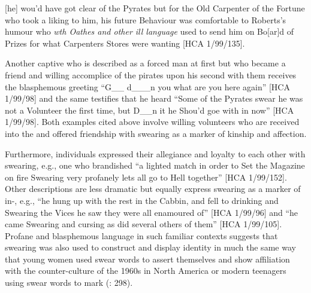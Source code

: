 [he] wou’d have got clear of the Pyrates but for the Old Carpenter of the Fortune who took a liking to him, his future Behaviour was comfortable to Roberts’s humour who \textit{wth Oathes and other ill language} used to send him on Bo[ar]d of Prizes for what Carpenters Stores were wanting [HCA 1/99/135]. 

Another captive who is described as a forced man at first but who became a friend and willing accomplice of the pirates upon his second  with them receives the blasphemous greeting “G\_\_ d\_\_\_n you what are you here again” [HCA 1/99/98] and the same  testifies that he heard “Some of the Pyrates swear he was not a Volunteer the first time, but D\_\_n it he Shou’d goe with in now” [HCA 1/99/98]. Both examples cited above involve willing volunteers who are received into the  and offered friendship with swearing as a marker of kinship and affection. 

Furthermore, individuals expressed their allegiance and loyalty to each other with swearing, e.g., one  who brandished “a lighted match in order to Set the Magazine on fire Swearing very profanely lets all go to Hell together” [HCA 1/99/152]. Other descriptions are less dramatic but equally express swearing as a marker of in-, e.g., “he hung up with the rest in the Cabbin, and fell to drinking and Swearing the Vices he saw they were all enamoured of” [HCA 1/99/96] and “he came Swearing and cursing as did several others of them” [HCA 1/99/105]. Profane and blasphemous language in such familiar contexts suggests that swearing was also used to construct and display identity in much the same way that young women used swear words to assert themselves and show affiliation with the counter-culture of the 1960s in North America \citep[60]{Carlisle2009} or modern teenagers using swear words to mark  (\citealt{Stapleton2010}: 298). 

